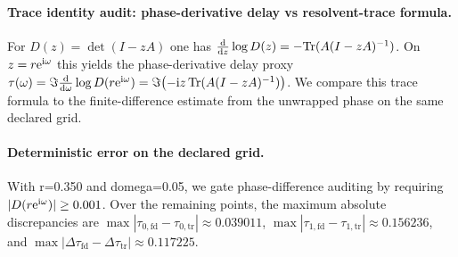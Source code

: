 \paragraph{Trace identity audit: phase-derivative delay vs resolvent-trace formula.} \AuditTag For $D(z)=\det(I-zA)$ one has $\frac{\mathrm{d}}{\mathrm{d} z}\log D(z)=-\mathrm{Tr}(A(I-zA)^{-1})$. On $z=r\mathrm{e}^{\mathrm{i}\omega}$ this yields the phase-derivative delay proxy $\tau(\omega)=\Im\frac{\mathrm{d}}{\mathrm{d}\omega}\log D(r\mathrm{e}^{\mathrm{i}\omega})=\Im\bigl(-\mathrm{i} z\,\mathrm{Tr}(A(I-zA)^{-1})\bigr)$. We compare this trace formula to the finite-difference estimate from the unwrapped phase on the same declared grid.
\paragraph{Deterministic error on the declared grid.} \AuditTag With r=0.350 and domega=0.05, we gate phase-difference auditing by requiring $|D(r\mathrm{e}^{\mathrm{i}\omega})|\ge 0.001$. Over the remaining points, the maximum absolute discrepancies are $\max|\tau_{0,\mathrm{fd}}-\tau_{0,\mathrm{tr}}|\approx0.039011$, $\max|\tau_{1,\mathrm{fd}}-\tau_{1,\mathrm{tr}}|\approx0.156236$, and $\max|\Delta\tau_{\mathrm{fd}}-\Delta\tau_{\mathrm{tr}}|\approx0.117225$.